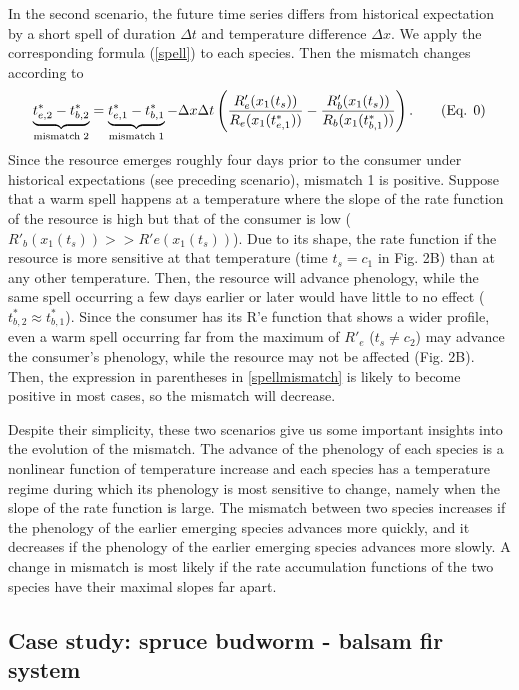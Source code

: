 \documentclass[12 pt]{article}
\begin{document}
In the second scenario, the future time series differs from historical expectation by a short spell of duration $\Delta t$ and temperature difference $\Delta x$. We apply the corresponding formula (\ref{spell}) to each species. Then the mismatch changes according to
\begin{equation}\label{spellmismatch}
    \underbrace{t_{e,2}^* - t_{b,2}^*}_{{\rm mismatch\; 2}} = \underbrace{t_{e,1}^* - t_{b,1}^*}_{{\rm mismatch\; 1}}-\Delta x\Delta t\left(\frac{R_e'(x_1(t_s))}{R_e(x_1(t_{e,1}^*))} - \frac{R_b'(x_1(t_s))}{R_b(x_1(t_{b,1}^*))}\right). \tag{Eq. \theequation}
\end{equation}
Since the resource emerges roughly four days prior to the consumer under historical expectations (see preceding scenario), mismatch 1 is positive. Suppose that a warm spell happens at a temperature where the slope of the rate function of the resource is high but that of the consumer is low ($R'_b(x_1(t_s))>>R'e(x_1(t_s))$). Due to its shape, the rate function if the resource is more sensitive at that temperature (time $t_s = c_1$ in Fig. 2B) than at any other temperature. Then, the resource will advance phenology, while the same spell occurring a few days earlier or later would have little to no effect ($t_{b,2}^* \approx t_{b,1}^*$). Since the consumer has its R’e function that shows a wider profile, even a warm spell occurring far from the maximum of $R'_e$ ($t_s \neq c_2$) may advance the consumer’s phenology, while the resource may not be affected (Fig. 2B). Then, the expression in parentheses in \ref{spellmismatch} is likely to become positive in most cases, so the mismatch will decrease.\par
Despite their simplicity, these two scenarios give us some important insights into the evolution of the mismatch. The advance of the phenology of each species is a nonlinear function of temperature increase and each species has a temperature regime during which its phenology is most sensitive to change, namely when the slope of the rate function is large. The mismatch between two species increases if the phenology of the earlier emerging species advances more quickly, and it decreases if the phenology of the earlier emerging species advances more slowly. A change in mismatch is most likely if the rate accumulation functions of the two species have their maximal slopes far apart.\par

\subsection{Case study: spruce budworm - balsam fir system}\label{resultscasestudy}
\end{document}
